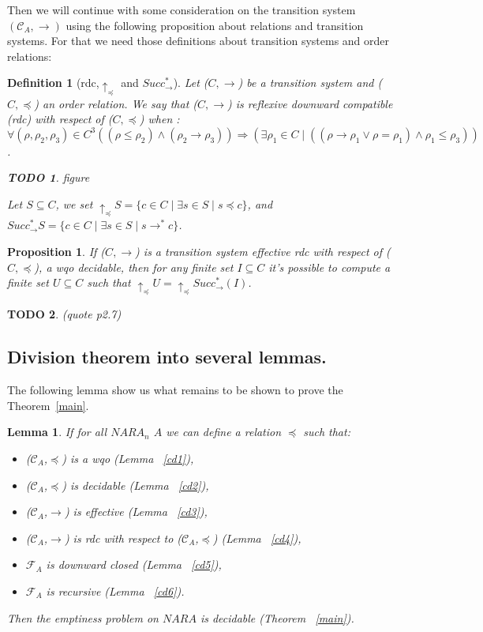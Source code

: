 \documentclass[a4paper,10pt]{report}
\newtheorem{lm}{Lemma}[thr]
\newtheorem{pp}{Proposition}
\newtheorem{df}{Definition}
\newtheorem{td}{TODO}
\newcommand{\C}{\mathcal{C}_{A}}
\newcommand{\F}{\mathcal{F}_{A}}
\begin{document}
Then we will continue with some consideration on the transition system $(\C,\rightarrow)$ using the following proposition about relations and transition systems.
For that we need those definitions about transition systems and order relations:

\begin{df}[rdc,$\uparrow_\preceq$ and $ Succ^*_\rightarrow$]
  Let ($C,\rightarrow$) be a transition system and ($C,\preceq$) an order relation.
  We say that ($C,\rightarrow$) is reflexive downward compatible (rdc) with respect of ($C,\preceq$) when :
 $$\forall (\rho,\rho_2,\rho_3) \in C^3  ((\rho \leq \rho_2) \wedge (\rho_2 \rightarrow \rho_3)) \Rightarrow (\exists \rho_1 \in C \mid ((\rho \rightarrow \rho_1 \vee \rho = \rho_1) \wedge \rho_1 \leq \rho_3))$$. 
 \begin{td}
  figure
 \end{td}

  Let $S \subseteq C$,
  we set $\uparrow_\preceq S = \{c \in C \mid \exists s \in S \mid s \preceq c \}$, and $Succ^*_\rightarrow S = \{c \in C \mid \exists s \in S \mid s \rightarrow^* c \}$.
\end{df}


\begin{pp} 
  \label{pp}
  If  ($C,\rightarrow$) is a transition system effective rdc with respect of ($C,\preceq$), a wqo decidable, then for any finite set $I\subseteq C$ it's possible to compute a finite set $U \subseteq C$ such that
  $\uparrow_\preceq U=\uparrow_\preceq Succ^*_\rightarrow (I)$.
\end{pp}

\begin{td}
  (quote p2.7)
\end{td}

\subsection{Division theorem into several lemmas.}

The following lemma show us what remains to be shown to prove the Theorem~\ref{main}.
\begin{lm}
    \label{mlm}
    If for all $NARA_n$ $A$ we can define a relation $\preceq$ such that: 
     \begin{itemize}
	\item ($\C$,$\preceq$) is a wqo (Lemma ~\ref{cd1}),
	\item ($\C$,$\preceq$) is decidable (Lemma ~\ref{cd2}),
	\item ($\C$,$\rightarrow$) is effective (Lemma ~\ref{cd3}),
	\item ($\C$,$\rightarrow$) is rdc with respect to ($\C$,$\preceq$) (Lemma ~\ref{cd4}),
	\item $\F$ is downward closed (Lemma ~\ref{cd5}),
	\item $\F$ is recursive (Lemma ~\ref{cd6}).
     \end{itemize}
      Then the emptiness problem on $NARA$ is decidable (Theorem ~\ref{main}).
\end{lm}
\end{document}
